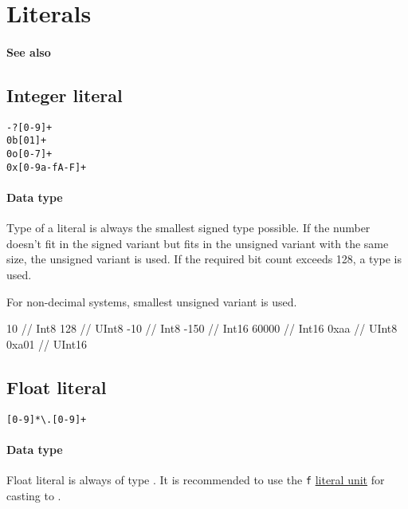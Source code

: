 \section{Literals}

\paragraph{See also} 

\subsection{Integer literal}
\begin{grammar}
	 \verb|-?[0-9]+| \\
	 \verb|0b[01]+| \\
	 \verb|0o[0-7]+| \\
	 \verb|0x[0-9a-fA-F]+|
\end{grammar}

\paragraph{Data type} Type of a literal is always the smallest signed type possible. If the number doesn't fit in the signed variant but fits in the unsigned variant with the same size, the unsigned variant is used. If the required bit count exceeds 128, a  type is used.

For non-decimal systems, smallest unsigned variant is used.

\begin{code}
10 // Int8
128 // UInt8
-10 // Int8
-150 // Int16
60000 // Int16
0xaa // UInt8
0xa01 // UInt16
\end{code}

\subsection{Float literal}
\begin{grammar}
	 \verb|[0-9]*\.[0-9]+|
\end{grammar}

\paragraph{Data type} Float literal is always of type . It is recommended to use the \verb|f| \hyperref[literalUnits]{literal unit} for casting to .


